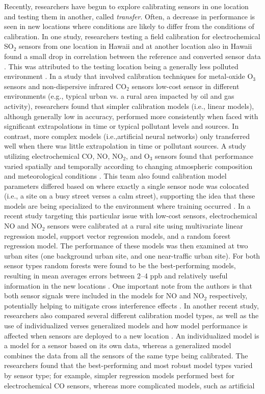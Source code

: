 \documentclass[journal abbreviation, manuscript]{copernicus}
\newcommand{\textus}[1]{$_{\text{#1}}$}
\begin{document}
Recently, researchers have begun to explore calibrating sensors in one location and testing them in another, called \textit{transfer}.  Often, a decrease in performance is seen in new locations where conditions are likely to differ from the conditions of calibration.  In one study, researchers testing a field calibration for electrochemical SO\textus{2} sensors from one location in Hawaii and at another location also in Hawaii found a small drop in correlation between the reference and converted sensor data \citep{Hagan2018}. This was attributed to the testing location being a generally less polluted environment \citep{Hagan2018}.  In a study that involved calibration techniques for metal-oxide O\textus{3} sensors and non-dispersive infrared CO\textus{2} sensors low-cost sensor in different environments (e.g., typical urban vs. a rural area impacted by oil and gas activity), researchers found that simpler calibration models (i.e., linear models), although generally low in accuracy, performed more consistently when faced with significant extrapolations in time or typical pollutant levels and sources\citep{Casey2018testing}. In contrast, more complex models (i.e.,artificial neural networks) only transferred well when there was little extrapolation in time or pollutant sources.  A study utilizing electrochemical CO, NO, NO\textus{2}, and O\textus{3} sensors found that performance varied spatially and temporally according to changing atmospheric composition and meteorological conditions \citep{Castell2017}. This team also found calibration model parameters differed based on where exactly a single sensor node was colocated (i.e., a site on a busy street verses a calm street), supporting the idea that these models are being specialized to the environment where training occurred \citep{Castell2017}.  In a recent study targeting this particular issue with low-cost sensors, electrochemical NO and NO\textus{2} sensors were calibrated at a rural site using multivariate linear regression model, support vector regression models, and a random forest regression model. The performance of these models was then examined at two urban sites (one background urban site, and one near-traffic urban site). For both sensor types random forests were found to be the best-performing models, resulting in mean averages errors between 2–4 ppb and relatively useful information in the new locations \citep{Bigi2018Performance}. One important note from the authors is that both sensor signals were included in the models for NO and NO\textus{2} respectively, potentially helping to mitigate cross interference effects \citep{Bigi2018Performance}. In another recent study, researchers also compared several different calibration model types, as well as the use of individualized verses generalized models and how model performance is affected when sensors are deployed to a new location \citep{Malings2018Development}.  An individualized model is a model for a sensor based on its own data, whereas a generalized model combines the data from all the sensors of the same type being calibrated. The researchers found that the best-performing and most robust model types varied by sensor type; for example, simpler regression models performed best for electrochemical CO sensors, whereas more complicated models, such as artificial 
\end{document}
